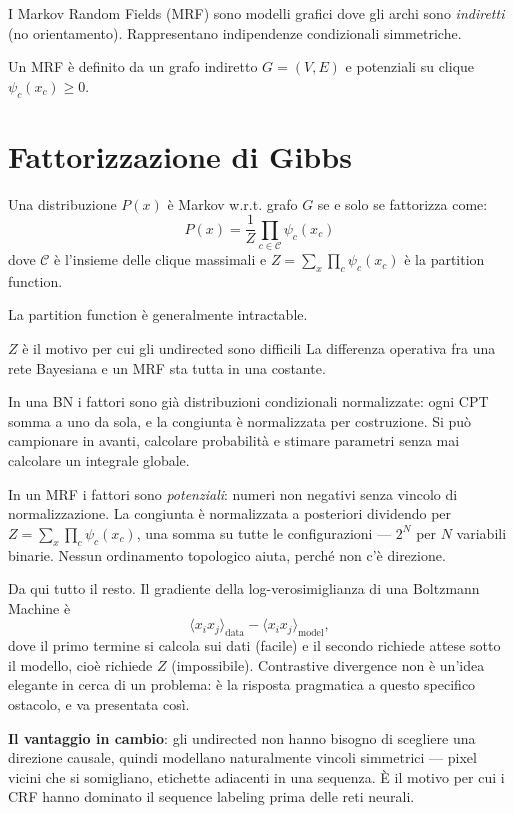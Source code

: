 I Markov Random Fields (MRF) sono modelli grafici dove gli archi sono \textit{indiretti} (no orientamento). Rappresentano indipendenze condizionali simmetriche.

\begin{definition}
  Un MRF è definito da un grafo indiretto $G = (V, E)$ e potenziali su clique $\psi_c(x_c) \geq 0$.
\end{definition}

\section{Fattorizzazione di Gibbs}

\begin{theorem}
  Una distribuzione $P(x)$ è Markov w.r.t. grafo $G$ se e solo se fattorizza come:
  \[P(x) = \frac{1}{Z} \prod_{c \in \mathcal{C}} \psi_c(x_c)\]
  dove $\mathcal{C}$ è l'insieme delle clique massimali e $Z = \sum_x \prod_c \psi_c(x_c)$ è la partition function.
\end{theorem}

La partition function è generalmente intractable.

\begin{intuizione}{$Z$ è il motivo per cui gli undirected sono difficili}
La differenza operativa fra una rete Bayesiana e un MRF sta tutta in una costante.

In una BN i fattori sono già distribuzioni condizionali normalizzate: ogni CPT somma a uno da sola, e la congiunta è normalizzata per costruzione. Si può campionare in avanti, calcolare probabilità e stimare parametri senza mai calcolare un integrale globale.

In un MRF i fattori sono \emph{potenziali}: numeri non negativi senza vincolo di normalizzazione. La congiunta è normalizzata a posteriori dividendo per $Z = \sum_x \prod_c \psi_c(x_c)$, una somma su tutte le configurazioni — $2^N$ per $N$ variabili binarie. Nessun ordinamento topologico aiuta, perché non c'è direzione.

Da qui tutto il resto. Il gradiente della log-verosimiglianza di una Boltzmann Machine è
\[
\langle x_i x_j \rangle_{\text{data}} - \langle x_i x_j \rangle_{\text{model}},
\]
dove il primo termine si calcola sui dati (facile) e il secondo richiede attese sotto il modello, cioè richiede $Z$ (impossibile). Contrastive divergence non è un'idea elegante in cerca di un problema: è la risposta pragmatica a questo specifico ostacolo, e va presentata così.

\textbf{Il vantaggio in cambio}: gli undirected non hanno bisogno di scegliere una direzione causale, quindi modellano naturalmente vincoli simmetrici — pixel vicini che si somigliano, etichette adiacenti in una sequenza. È il motivo per cui i CRF hanno dominato il sequence labeling prima delle reti neurali.
\end{intuizione}

